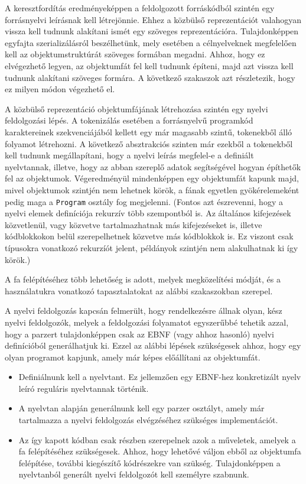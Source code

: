 
A keresztfordítás eredményeképpen a feldolgozott forráskódból szintén egy forrásnyelvi leírásnak kell létrejönnie. Ehhez a közbülső reprezentációt valahogyan vissza kell tudnunk alakítani ismét egy szöveges reprezentációra. Tulajdonképpen egyfajta szerializálásról beszélhetünk, mely esetében a célnyelveknek megfelelően kell az objektumstruktúrát szöveges formában megadni. Ahhoz, hogy ez elvégezhető legyen, az objektumfát fel kell tudnunk építeni, majd azt vissza kell tudnunk alakítani szöveges formára. A következő szakaszok azt részletezik, hogy ez milyen módon végezhető el.


A közbülső reprezentáció objektumfájának létrehozása szintén egy nyelvi feldolgozási lépés. A tokenizálás esetében a forrásnyelvű programkód karaktereinek szekvenciájából kellett egy már magasabb szintű, tokenekből álló folyamot létrehozni. A következő absztrakciós szinten már ezekből a tokenekből kell tudnunk megállapítani, hogy a nyelvi leírás megfelel-e a definiált nyelvtannak, illetve, hogy az abban szereplő adatok segítségével hogyan építhetők fel az objektumok. Végeredményül mindenképpen egy objektumfát kapunk majd, mivel objektumok szintjén nem lehetnek körök, a fának egyetlen gyökérelemeként pedig maga a \texttt{Program} osztály fog megjelenni. (Fontos azt észrevenni, hogy a nyelvi elemek definíciója rekurzív több szempontból is. Az általános kifejezések közvetlenül, vagy közvetve tartalmazhatnak más kifejezéseket is, illetve kódblokkokon belül szerepelhetnek közvetve más kódblokkok is. Ez viszont csak típusokra vonatkozó rekurzíót jelent, példányok szintjén nem alakulhatnak ki így körök.)

A fa felépítéséhez több lehetőség is adott, melyek megközelítési módját, és a használatukra vonatkozó tapasztalatokat az alábbi szakaszokban szerepel.


A nyelvi feldolgozás kapcsán felmerült, hogy rendelkezésre állnak olyan, kész nyelvi feldolgozók, melyek a feldolgozási folyamatot egyszerűbbé tehetik azzal, hogy a parzert tulajdonképpen csak az EBNF (vagy ahhoz hasonló) nyelvi definícióból generálhatjuk ki. Ezzel az alábbi lépések szükségesek ahhoz, hogy egy olyan programot kapjunk, amely már képes előállítani az objektumfát.
\begin{itemize}
\item Definiálnunk kell a nyelvtant. Ez jellemzően egy EBNF-hez konkretizált nyelv leíró reguláris nyelvtannak történik.
\item A nyelvtan alapján generálnunk kell egy parzer osztályt, amely már tartalmazza a nyelvi feldolgozás elvégzéséhez szükséges implementációt.
\item Az így kapott kódban csak részben szerepelnek azok a műveletek, amelyek a fa felépítéséhez szükségesek. Ahhoz, hogy lehetővé váljon ebből az objektumfa felépítése, további kiegészítő kódrészekre van szükség. Tulajdonképpen a nyelvtanból generált nyelvi feldolgozót kell személyre szabnunk.
\end{itemize}

